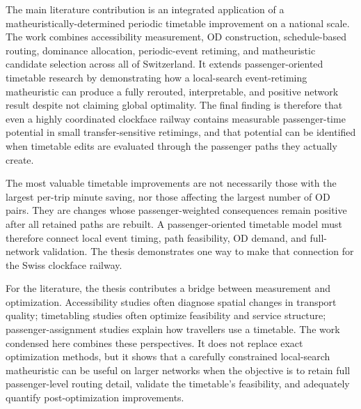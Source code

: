 \documentclass[conference]{IEEEtran}
\begin{document}
The main literature contribution is an integrated application of a matheuristically-determined periodic timetable improvement on a national scale. The work combines accessibility measurement, OD construction, schedule-based routing, dominance allocation, periodic-event retiming, and matheuristic candidate selection across all of Switzerland. It extends passenger-oriented timetable research by demonstrating how a local-search event-retiming matheuristic can produce a fully rerouted, interpretable, and positive network result despite not claiming global optimality. The final finding is therefore that even a highly coordinated clockface railway contains measurable passenger-time potential in small transfer-sensitive retimings, and that potential can be identified when timetable edits are evaluated through the passenger paths they actually create.

The most valuable timetable improvements are not necessarily those with the largest per-trip minute saving, nor those affecting the largest number of OD pairs. They are changes whose passenger-weighted consequences remain positive after all retained paths are rebuilt. A passenger-oriented timetable model must therefore connect local event timing, path feasibility, OD demand, and full-network validation. The thesis demonstrates one way to make that connection for the Swiss clockface railway.

For the literature, the thesis contributes a bridge between measurement and optimization. Accessibility studies often diagnose spatial changes in transport quality; timetabling studies often optimize feasibility and service structure; passenger-assignment studies explain how travellers use a timetable. The work condensed here combines these perspectives. It does not replace exact optimization methods, but it shows that a carefully constrained local-search matheuristic can be useful on larger networks when the objective is to retain full passenger-level routing detail, validate the timetable's feasibility, and adequately quantify post-optimization improvements.
\newpage


\end{document}
